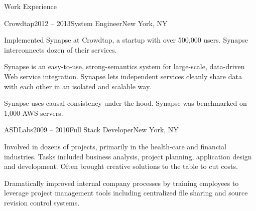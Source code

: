 \documentclass{resume} %
\begin{document}
\begin{rSection}{Work Experience}


\begin{rSubsection}{Crowdtap}{2012 -- 2013}{System Engineer}{New York, NY}
\item Implemented Synapse at Crowdtap, a startup with over 500,000 users. Synapse interconnects dozen of their services.
\item Synapse is an easy-to-use, strong-semantics system for large-scale, data-driven Web service integration.
   Synapse lets independent services cleanly share data with each other in an isolated and scalable way.
\item Synapse uses causal consistency under the hood. Synapse was benchmarked on 1,000 AWS servers.
\end{rSubsection}



\begin{rSubsection}{ASDLabs}{2009 -- 2010}{Full Stack Developer}{New York, NY}
\item Involved in dozens of projects, primarily in the health-care and financial
      industries. Tasks included business analysis, project planning, application
      design and development. Often brought creative solutions to the table to cut costs.
\item Dramatically improved internal company processes by training employees to
      leverage project management tools including centralized file sharing and source revision control systems.
\end{rSubsection}


\end{rSection}
\end{document}
